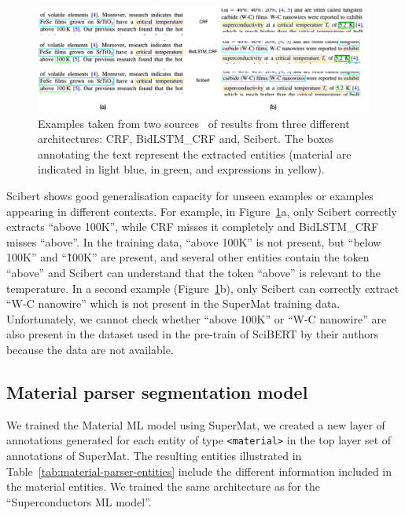 \begin{figure}[htbp]
    \centering
    \includegraphics[width=\textwidth]{figures/automatic_extraction_supercon/example-comparison-archs.png}
    \caption{Examples taken from two sources~\cite{Gajda_2016, Shibata_2016} of results from three different architectures: CRF, BidLSTM\_CRF and, Scibert. The boxes annotating the text represent the extracted entities (material are indicated in light blue, \tc in green, and \tc expressions in yellow).}
    \label{fig:example-comparison-architectures}
\end{figure}

Scibert shows good generalisation capacity for unseen examples or examples appearing in different contexts.
For example, in Figure~\ref{fig:example-comparison-architectures}a, only Scibert correctly extracts ``above 100K'', while CRF misses it completely and BidLSTM\_CRF misses ``above''.
In the training data, ``above 100K'' is not present, but ``below 100K'' and ``\~100K'' are present, and several other entities contain the token ``above'' and Scibert can understand that the token ``above'' is relevant to the temperature.
In a second example (Figure~\ref{fig:example-comparison-architectures}b), only Scibert can correctly extract ``W-C nanowire'' which is not present in the SuperMat training data.
Unfortunately, we cannot check whether ``above 100K'' or ``W-C nanowire'' are also present in the dataset used in the pre-train of SciBERT by their authors~\cite{Beltagy2019SciBERT} because the data are not available.


\subsection{Material parser segmentation model}

We trained the Material ML model using SuperMat, we created a new layer of annotations generated for each entity of type \texttt{<material>} in the top layer set of annotations of SuperMat. The resulting entities illustrated in Table~\ref{tab:material-parser-entities} include the different information included in the material entities.
We trained the same architecture as for the ``Superconductors ML model''.

